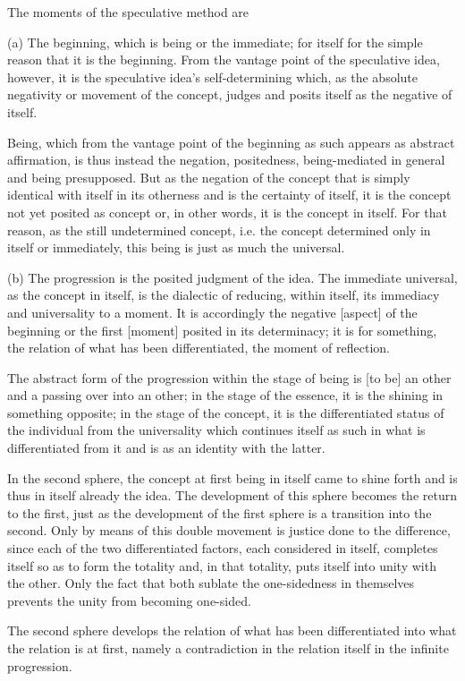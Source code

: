 The moments of the speculative method are

(a) The beginning, which is being or the immediate;
for itself for the simple reason that it is the beginning.
From the vantage point of the speculative idea, however,
it is the speculative idea's self-determining which,
as the absolute negativity or movement of the concept,
judges and posits itself as the negative of itself.

Being, which from the vantage point of the beginning as such
appears as abstract affirmation, is thus instead the negation,
positedness, being-mediated in general and being presupposed.
But as the negation of the concept that is
simply identical with itself in its otherness
and is the certainty of itself,
it is the concept not yet posited as concept
or, in other words,
it is the concept in itself.
For that reason, as the still undetermined concept,
i.e. the concept determined only in itself or immediately,
this being is just as much the universal.

(b) The progression is the posited judgment of the idea.
The immediate universal, as the concept in itself,
is the dialectic of reducing, within itself,
its immediacy and universality to a moment.
It is accordingly the negative [aspect] of the beginning
or the first [moment] posited in its determinacy;
it is for something,
the relation of what has been differentiated,
the moment of reflection.

The abstract form of the progression
within the stage of being is
[to be] an other and a passing over into an other;
in the stage of the essence,
it is the shining in something opposite;
in the stage of the concept,
it is the differentiated status of
the individual from the universality
which continues itself as such in
what is differentiated from it
and is as an identity with the latter.

In the second sphere, the concept at first
being in itself came to shine forth
and is thus in itself already the idea.
The development of this sphere becomes
the return to the first,
just as the development of the first sphere is
a transition into the second.
Only by means of this double movement is
justice done to the difference,
since each of the two differentiated factors,
each considered in itself,
completes itself so as to form the totality
and, in that totality,
puts itself into unity with the other.
Only the fact that both sublate the one-sidedness
in themselves prevents the unity from becoming one-sided.

The second sphere develops the relation of
what has been differentiated
into what the relation is at first,
namely a contradiction in the relation itself
in the infinite progression.

